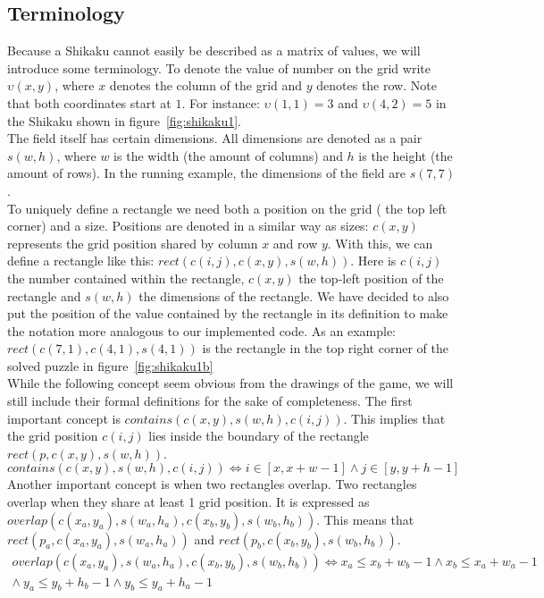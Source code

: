 \subsection{Terminology}
Because a Shikaku cannot easily be described as a matrix of values, we will introduce some terminology. To denote the value of number on the grid write $\upsilon(x,y)$, where $x$ denotes the column of the grid and $y$ denotes the row. Note that both coordinates start at $1$. For instance: $\upsilon(1,1) = 3$ and $\upsilon(4,2) = 5$ in the Shikaku shown in figure~\ref{fig:shikaku1}. 
\\
The field itself has certain dimensions. All dimensions are denoted as a pair $s(w,h)$, where $w$ is the width (the amount of columns) and $h$ is the height (the amount of rows). In the running example, the dimensions of the field are $s(7,7)$. 
\\
To uniquely define a rectangle we need both a position on the grid ( the top left corner) and a size. Positions are denoted in a similar way as sizes: $c(x,y)$ represents the grid position shared by column $x$ and row $y$. With this, we can define a rectangle like this: $rect(c(i,j),c(x,y),s(w,h))$. Here is $c(i,j)$ the number contained within the rectangle, $c(x,y)$ the top-left position of the rectangle and $s(w,h)$ the dimensions of the rectangle. We have decided to also put the position of the value contained by the rectangle in its definition to make the notation more analogous to our implemented code. As an example: $rect(c(7,1),c(4,1),s(4,1))$ is the rectangle in the top right corner of the solved puzzle in figure~\ref{fig:shikaku1b} 
\\
While the following concept seem obvious from the drawings of the game, we will still include their formal definitions for the sake of completeness. The first important concept is $contains(c(x,y), s(w,h),c(i,j))$. This implies that the grid position $c(i,j)$ lies inside the boundary of the rectangle $rect(p,c(x,y),s(w,h))$.
\begin{equation}
contains(c(x,y), s(w,h),c(i,j)) \iff i \in [x,x+w-1] \wedge j \in [y,y+h-1]
\end{equation}
Another important concept is when two rectangles overlap. Two rectangles overlap when they share at least 1 grid position. It is expressed as $overlap(c(x_a,y_a), s(w_a,h_a),c(x_b,y_b), s(w_b,h_b))$. This means that $rect(p_a, c(x_a,y_a), s(w_a,h_a))$ and $rect(p_b,c(x_b,y_b), s(w_b,h_b))$.
\begin{equation}
\begin{split}
overlap(c(x_a,y_a), s(w_a,h_a),c(x_b,y_b), s(w_b,h_b)) \iff x_a \leq x_b + w_b -1 \wedge x_b \leq x_a + w_a - 1  \\
									   \wedge \: y_a \leq y_b + h_b -1 \wedge y_b \leq y_a + h_a - 1 
\end{split}
\end{equation}

